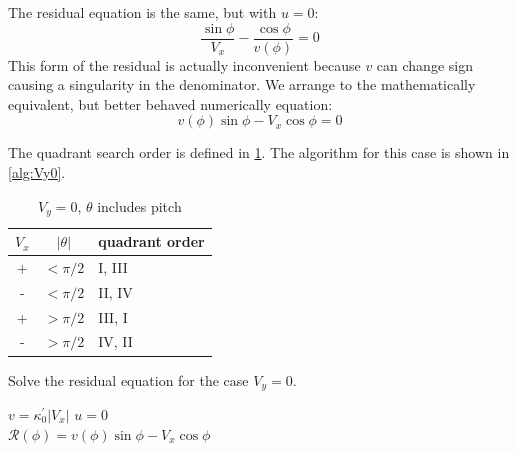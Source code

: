 \documentclass{article}
\begin{document}
The residual equation is the same, but with $u = 0$:
\begin{equation}
    \frac{\sin\phi}{V_x} - \frac{\cos\phi}{v(\phi)} = 0
\end{equation}
This form of the residual is actually inconvenient because $v$ can change sign causing a singularity in the denominator.  We arrange to the mathematically equivalent, but better behaved numerically equation:
\begin{equation}
    v(\phi)\sin\phi - V_x \cos\phi = 0
\end{equation}

The quadrant search order is defined in \cref{tab:bracket3}.  
The algorithm for this case is shown in \cref{alg:Vy0}.

\begin{table}[htb]
\centering
\caption{$V_y = 0$, $\theta$ includes pitch}
\label{tab:bracket3}
\begin{tabular}{@{}ccl@{}}
\toprule
$V_x$ & $|\theta|$ & quadrant order \\
\midrule
+ & $< \pi/2$ & I, III \\
- & $< \pi/2$ & II, IV \\
+ & $> \pi/2$ & III, I \\
- & $> \pi/2$ & IV, II \\
\bottomrule
\end{tabular}
\end{table}

\begin{algorithm}[htbp]
\caption{Solve the residual equation for the case $V_y = 0$.}
\begin{algorithmic}
\State $v = \kappa_0^\prime |V_x|$
\State $u = 0$
\\
\State $\mathcal{R}(\phi) = v(\phi)\sin\phi - V_x \cos\phi$

\end{algorithmic}
\label{alg:Vy0}
\end{algorithm}
\end{document}
